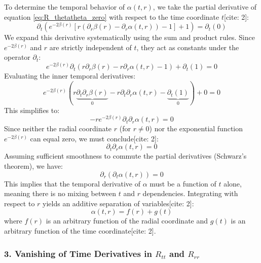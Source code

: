 \documentclass[11pt, a4paper]{report}
\begin{document}
To determine the temporal behavior of $\alpha(t,r)$, we take the partial derivative of equation \eqref{eq:R_thetatheta_zero} with respect to the time coordinate $t$[cite: 2]:
\begin{equation}
    \partial_t \left( e^{-2\beta(r)} \left[ r(\partial_r \beta(r) - \partial_r \alpha(t,r)) - 1 \right] + 1 \right) = \partial_t (0)
\end{equation}
We expand this derivative systematically using the sum and product rules. Since $e^{-2\beta(r)}$ and $r$ are strictly independent of $t$, they act as constants under the operator $\partial_t$:
\begin{equation}
    e^{-2\beta(r)} \partial_t \left( r\partial_r \beta(r) - r\partial_r \alpha(t,r) - 1 \right) + \partial_t(1) = 0
\end{equation}
Evaluating the inner temporal derivatives:
\begin{equation}
    e^{-2\beta(r)} \left( r\underbrace{\partial_t \partial_r \beta(r)}_{0} - r\partial_t \partial_r \alpha(t,r) - \underbrace{\partial_t(1)}_{0} \right) + 0 = 0
\end{equation}
This simplifies to:
\begin{equation}
    -r e^{-2\beta(r)} \partial_t \partial_r \alpha(t,r) = 0 \label{eq:dt_dr_alpha}
\end{equation}
Since neither the radial coordinate $r$ (for $r \neq 0$) nor the exponential function $e^{-2\beta(r)}$ can equal zero, we must conclude[cite: 2]:
\begin{equation}
    \partial_t \partial_r \alpha(t,r) = 0
\end{equation}
Assuming sufficient smoothness to commute the partial derivatives (Schwarz's theorem), we have:
\begin{equation}
    \partial_r (\partial_t \alpha(t,r)) = 0
\end{equation}
This implies that the temporal derivative of $\alpha$ must be a function of $t$ alone, meaning there is no mixing between $t$ and $r$ dependencies. Integrating with respect to $r$ yields an additive separation of variables[cite: 2]:
\begin{equation}
    \alpha(t,r) = f(r) + g(t) \label{eq:alpha_separable}
\end{equation}
where $f(r)$ is an arbitrary function of the radial coordinate and $g(t)$ is an arbitrary function of the time coordinate[cite: 2].

\subsubsection*{3. Vanishing of Time Derivatives in $R_{tt}$ and $R_{rr}$}
\end{document}
